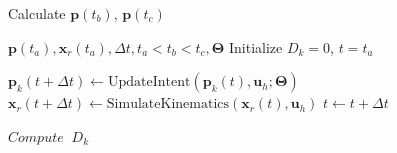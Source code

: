 \begin{algorithm}
	\caption{Calculate $\boldsymbol{p}(t_b)$, $\boldsymbol{p}(t_c)$}
	\label{alg1}
	\begin{algorithmic}[1]
		\REQUIRE $\boldsymbol{p}(t_a), \boldsymbol{x}_r(t_a), \Delta t, t_a < t_b < t_c, \boldsymbol{\Theta}$
		\STATE Initialize $D_k = 0$, $t = t_a$
		
			\STATE $\boldsymbol{p}_k(t + \Delta t) \leftarrow \text{UpdateIntent}(\boldsymbol{p}_k(t), \boldsymbol{u}_h; \boldsymbol{\Theta})$
			\STATE $\boldsymbol{x}_r(t + \Delta t) \leftarrow \text{SimulateKinematics}(\boldsymbol{x}_r(t), \boldsymbol{u}_h)$
			  
			\ENDIF
			  \ENDIF
			\STATE $t \leftarrow t + \Delta t$
		\ENDWHILE
	
%		
		
		\STATE $Compute \;\;D_k$
		\ENDFOR
		
	\end{algorithmic}
\end{algorithm}

